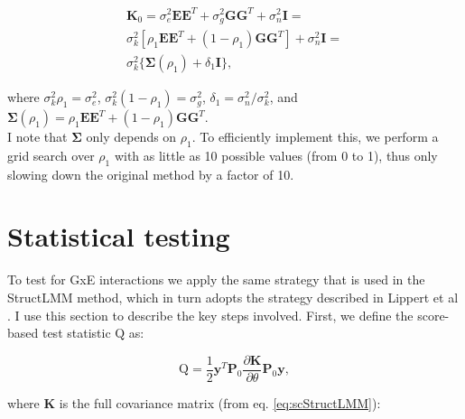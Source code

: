 \begin{equation}
\begin{split}
    \mathbf{K}_0 = \sigma_e^2 \mathbf{E}\mathbf{E}^T + \sigma_g^2 \mathbf{G}\mathbf{G}^T+ \sigma_n^2 \mathbf{I} =\\
    \sigma_k^2[\rho_1\mathbf{E}\mathbf{E}^T + (1-\rho_1) \mathbf{G}\mathbf{G}^T] + \sigma_n^2 \mathbf{I} =\\ \sigma_k^2\{\boldsymbol{\Sigma}(\rho_1) + \delta_1 \mathbf{I}\},
\end{split}
\end{equation}

where $\sigma_k^2\rho_1 = \sigma_e^2$,
$\sigma_k^2(1-\rho_1) = \sigma_g^2$,
$\delta_1 = \sigma_n^2/\sigma_k^2$, and $\boldsymbol{\Sigma}(\rho_1) = \rho_1\mathbf{E}\mathbf{E}^T + (1-\rho_1) \mathbf{G}\mathbf{G}^T$.\\

I note that $\boldsymbol{\Sigma}$ only depends on $\rho_1$. 
To efficiently implement this, we perform a grid search over $\rho_1$ with as little as 10 possible values (from 0 to 1), thus only slowing down the original method by a factor of 10.

\section{Statistical testing}

To test for GxE interactions we apply the same strategy that is used in the StructLMM method, which in turn adopts the strategy described in Lippert et al \cite{lippert2011fast}.
I use this section to describe the key steps involved.
First, we define the score-based test statistic $\mathrm{Q}$ as:

\begin{equation}\label{eq:Q}
    \mathrm{Q} = \frac{1}{2}\mathbf{y}^T\mathbf{P}_0 \frac{\partial \mathbf{K}}{\partial \theta}\mathbf{P}_0 \mathbf{y}, 
\end{equation}

where $\mathbf{K}$ is the full covariance matrix (from eq. \eqref{eq:scStructLMM}):


